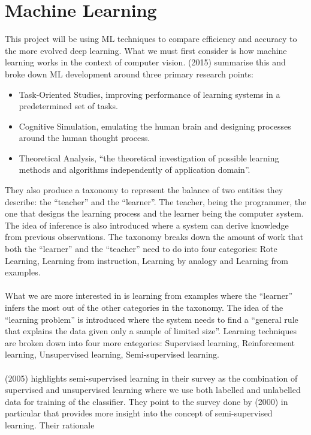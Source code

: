 \documentclass{article}
\begin{document}
\section{Machine Learning}
This project will be using ML techniques to compare efficiency and accuracy to the more evolved deep learning. 
What we must first consider is how machine learning works in the context of computer vision. 
\citeauthor{CamastraFrancescoMLfA} (2015) summarise this and broke down ML development around three primary research points:
\begin{itemize}
    \item Task-Oriented Studies, improving performance of learning systems in a predetermined set of tasks.
    \item Cognitive Simulation, emulating the human brain and designing processes around the human thought process.
    \item Theoretical Analysis, “the theoretical investigation of possible learning methods and algorithms 
    independently of application domain”.
\end{itemize}
They also produce a taxonomy to represent the balance of two entities they describe: the “teacher” and the “learner”. 
The teacher, being the programmer, the one that designs the learning process and the learner being the computer system. 
The idea of inference is also introduced where a system can derive knowledge from previous observations. The taxonomy 
breaks down the amount of work that both the “learner” and the “teacher” need to do into four categories: Rote Learning,
 Learning from instruction, Learning by analogy and Learning from examples.
 \\
 \\
 What we are more interested in is learning from examples where the “learner” infers the most out of the other 
 categories in the taxonomy. The idea of the “learning problem” is introduced where the system needs to find a “general 
 rule that explains the data given only a sample of limited size”. Learning techniques are broken down into four more 
 categories: Supervised learning, Reinforcement learning, Unsupervised learning, Semi-supervised learning.
\\
\\
\citeauthor{zhu2005semi} (2005) highlights semi-supervised learning in their survey as the combination of supervised and unsupervised 
learning where we use both labelled and unlabelled data for training of the classifier. They point to the survey done by
 \citeauthor{seeger2000learning} (2000) in particular that provides more insight into the concept of semi-supervised learning. Their rationale 
\end{document}

